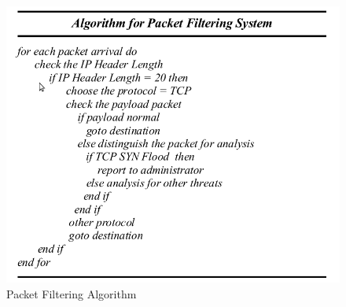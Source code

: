 \begin{figure}[H]
\centering
\includegraphics[width=1\textwidth]{./images/AlgorithmAnomalyDetection.png}
\caption{Packet Filtering Algorithm} \label{fig:AlgorithmAnomalyDetection}
\end{figure}

